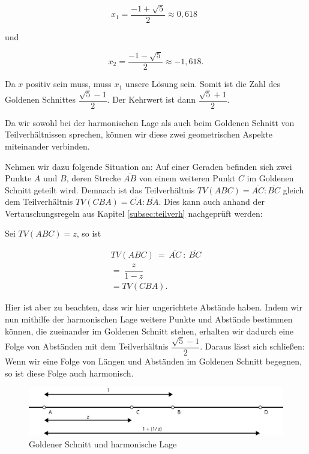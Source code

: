 \documentclass[12pt,a4paper]{article}
\begin{document}
\[x_1 = \dfrac{-1 + \sqrt{5}}{2} \approx 0,618~~ \]

und

\[ x_2 = \dfrac{-1 - \sqrt{5}}{2} \approx -1,618.\]

Da $x$ positiv sein muss, muss $x_1$ unsere Lösung sein. Somit ist die Zahl des Goldenen Schnittes $\dfrac{\sqrt{5}-1}{2}$. Der Kehrwert ist dann $\dfrac{\sqrt{5}+1}{2}$.

Da wir sowohl bei der harmonischen Lage als auch beim Goldenen Schnitt von Teilverhältnissen sprechen, können wir diese zwei geometrischen Aspekte miteinander verbinden.

Nehmen wir dazu folgende Situation an: Auf einer Geraden befinden sich zwei Punkte $A$ und $B$, deren Strecke $\overline{A B}$ von einem weiteren Punkt $C$ im Goldenen Schnitt geteilt wird. Demnach ist das Teilverhältnis $TV(A B C) = \overline{A C} : \overline{B C}$ gleich dem Teilverhältnis $TV(C B A) = \overline{C A} : \overline{B A}$. Dies kann auch anhand der Vertauschungsregeln aus Kapitel \ref{subsec:teilverh} nachgeprüft werden:

Sei $TV(A B C) = z$, so ist

\begin{equation*}
\begin{split}
TV(A B C)~=~\overline{A C}~:~\overline{B C}\\
=~\dfrac{z}{1-z}~~~~~~\\
=TV(C B A).
\end{split}
\end{equation*}

Hier ist aber zu beachten, dass wir hier ungerichtete Abstände haben. Indem wir nun mithilfe der harmonischen Lage weitere Punkte und Abstände bestimmen können, die zueinander im Goldenen Schnitt stehen, erhalten wir dadurch eine Folge von Abständen mit dem Teilverhältnis $\dfrac{\sqrt{5}-1}{2}$. Daraus lässt sich schließen: Wenn wir eine Folge von Längen und Abständen im Goldenen Schnitt begegnen, so ist diese Folge auch harmonisch.

\begin{figure}[htbp]
\centering
\includegraphics[width=\textwidth]{Bilder/goldenratio.png}
\caption{Goldener Schnitt und harmonische Lage}
\label{fig:goldRatio}
\end{figure}
\end{document}
